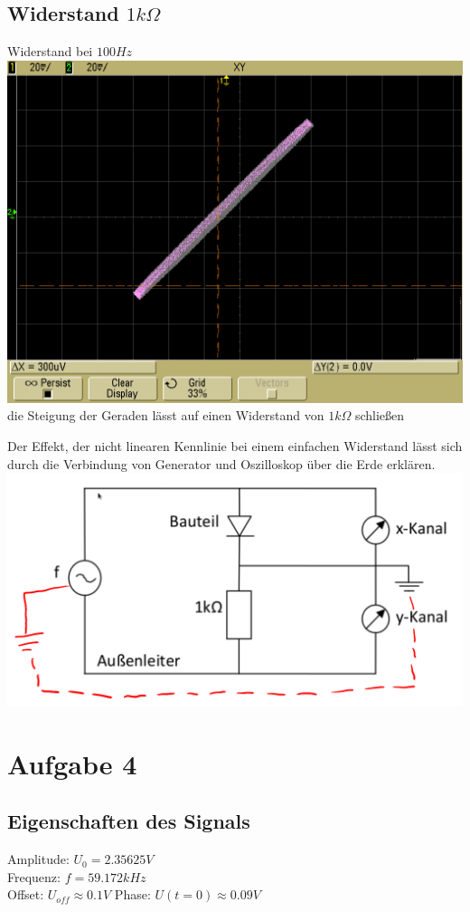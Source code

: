\documentclass[compress,11pt]{beamer}
\begin{document}
\subsection{Widerstand $1k\Omega$}
\begin{frame}
Widerstand bei $100Hz$
\includegraphics[width=\textwidth]{images/scope_5}
die Steigung der Geraden lässt auf einen Widerstand von $1k\Omega$ schließen
\end{frame}

\begin{frame}
Der Effekt, der nicht linearen Kennlinie bei einem einfachen Widerstand lässt sich durch die Verbindung von Generator und Oszilloskop über die Erde erklären.
\includegraphics[width=\textwidth]{images/3-erde.png}
\end{frame}

\section{Aufgabe 4}
\begin{frame}
\subsection{Eigenschaften des Signals}
Amplitude: $U_0 = 2.35625 V$ \\
Frequenz: $f = 59.172 kHz$ \\
Offset: $U_{off} \approx 0.1 V$
Phase: $U(t=0) \approx 0.09 V$\
\end{frame}
\end{document}
